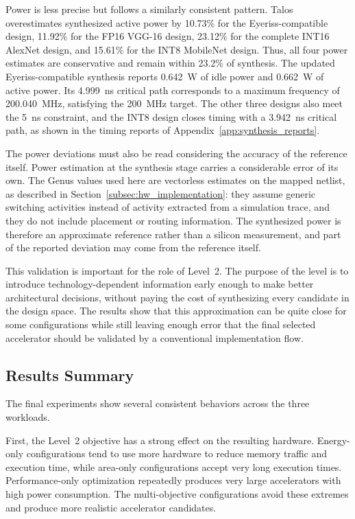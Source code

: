 Power is less precise but follows a similarly consistent pattern. Talos
overestimates synthesized active power by 10.73\% for the
Eyeriss-compatible design, 11.92\% for the FP16 VGG-16 design, 23.12\%
for the complete INT16 AlexNet design, and 15.61\% for the INT8
MobileNet design. Thus, all four power estimates are conservative and
remain within 23.2\% of synthesis. The updated Eyeriss-compatible
synthesis reports 0.642~W of idle power and 0.662~W of active power.
Its 4.999~ns critical path corresponds to a maximum frequency of
200.040~MHz, satisfying the 200~MHz target. The other three designs
also meet the 5~ns constraint, and the INT8 design closes timing with
a 3.942~ns critical path, as shown in the timing reports of
Appendix~\ref{app:synthesis_reports}.

The power deviations must also be read considering the accuracy of
the reference itself. Power estimation at the synthesis stage carries
a considerable error of its own. The Genus values used here are
vectorless estimates on the mapped netlist, as described in
Section~\ref{subsec:hw_implementation}: they assume generic switching
activities instead of activity extracted from a simulation trace, and
they do not include placement or routing information. The synthesized
power is therefore an approximate reference rather than a silicon
measurement, and part of the reported deviation may come from the
reference itself.

This validation is important for the role of Level~2. The purpose of
the level is to introduce technology-dependent information early enough
to make better architectural decisions, without paying the cost of
synthesizing every candidate in the design space. The results show that
this approximation can be quite close for some configurations while
still leaving enough error that the final selected accelerator should be
validated by a conventional implementation flow.

\subsection{Results Summary}
The final experiments show several consistent behaviors across the
three workloads.

First, the Level~2 objective has a strong effect on the resulting
hardware. Energy-only configurations tend to use more hardware to
reduce memory traffic and execution time, while area-only
configurations accept very long execution times. Performance-only
optimization repeatedly produces very large accelerators with high
power consumption. The multi-objective configurations avoid these
extremes and produce more realistic accelerator candidates.

